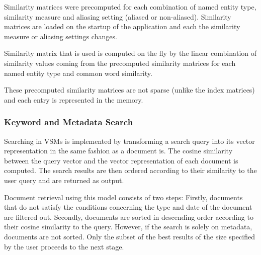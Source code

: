 Similarity matrices were precomputed for each combination of named entity type, similarity measure and aliasing setting (aliased or non-aliased).
Similarity matrices are loaded on the startup of the application and each the similarity measure or aliasing settings changes.

Similarity matrix that is used is computed on the fly by the linear combination of similarity values coming from the precomputed similarity matrices for each named entity type and common word similarity.

These precomputed similarity matrices are not sparse (unlike the index matrices) and each entry is represented in the memory.   

\subsubsection{Keyword and Metadata Search}\label{sec:keyword_search}

Searching in VSMs is implemented by transforming a search query into its vector representation in the same fashion as a document is. The cosine similarity between the query vector and the vector representation of each document is computed. The search results are then ordered according to their similarity to the user query and are returned as output. 

Document retrieval using this model consists of two steps: Firstly, documents that do not satisfy the conditions concerning the type and date of the document are filtered out. Secondly, documents are sorted in descending order according to their cosine similarity to the query. However, if the search is solely on metadata, documents are not sorted. Only the subset of the best results of the size specified by the user proceeds to the next stage.

